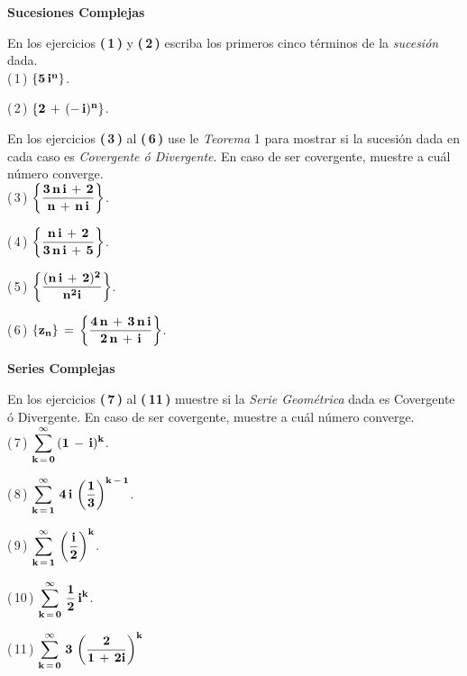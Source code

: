 \documentclass[a4paper,11pt,openany]{book}
\begin{document}
\newpage




\begin{center}
\textbf{Sucesiones Complejas}
\end{center}

En los ejercicios \textbf{(\,1\,)} y \textbf{(\,2\,)} escriba los primeros cinco términos de la {\it sucesión} dada.\\

\textcolor{ao(english)}{(\,1\,)} $\bf{\{5\,i^{n}\}}$.

\textcolor{ao(english)}{(\,2\,)} $\bf{\{2\,+\,(-\,i)^{n}\}}$.

En los ejercicios \textbf{(\,3\,)} al \textbf{(\,6\,)} use le \textcolor{mediumviolet-red}{{\it Teorema} 1} para mostrar si la sucesión dada en cada caso es {\it Covergente ó Divergente}. En caso de ser covergente, muestre a cuál número converge.\\

\textcolor{ao(english)}{(\,3\,)} $\bf{\left\{\dfrac{3\,n\,i\,+\,2}{n\,+\,n\,i}\right\}}$.

\textcolor{ao(english)}{(\,4\,)} $\bf{\left\{\dfrac{n\,i\,+\,2}{3\,n\,i\,+\,5}\right\}}$.

\textcolor{ao(english)}{(\,5\,)} $\bf{\left\{\dfrac{(n\,i\,+\,2)^{2}}{n^{2}i}\right\}}$.

\textcolor{ao(english)}{(\,6\,)} $\bf{\{z_{n}\}\,=\,\left\{\dfrac{4\,n\,+\,3\,n\,i}{2\,n\,+\,i}\right\}}$.

\begin{center}
\textbf{Series Complejas}
\end{center}

En los ejercicios \textbf{(\,7\,)} al \textbf{(\,11\,)} muestre si la \textcolor{mint}{{\it Serie Geométrica}} dada es Covergente ó Divergente. En caso de ser covergente, muestre a cuál número converge.\\

\textcolor{ao(english)}{(\,7\,)} $\bf{\displaystyle\sum\limits_{k\,=\,0}^{\infty}\,(1\,-\,i)^{k}}$.

\textcolor{ao(english)}{(\,8\,)} $\bf{\displaystyle\sum\limits_{k\,=\,1}^{\infty}\,4\,i\,\left(\dfrac{1}{3}\right)^{k\,-\,1}}$.

\textcolor{ao(english)}{(\,9\,)} $\bf{\displaystyle\sum\limits_{k\,=\,1}^{\infty}\,\left(\dfrac{i}{2}\right)^{k}}$.

\textcolor{ao(english)}{(\,10\,)} $\bf{\displaystyle\sum\limits_{k\,=\,0}^{\infty}\,\dfrac{1}{2}\,i^{k}}$.

\textcolor{ao(english)}{(\,11\,)} $\bf{\displaystyle\sum\limits_{k\,=\,0}^{\infty}\,3\,\left(\dfrac{2}{1\,+\,2i}\right)^{k}}$
\end{document}
